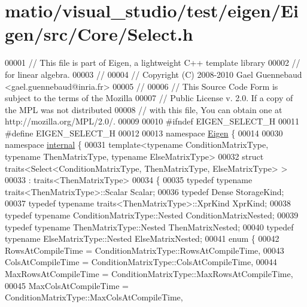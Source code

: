 \hypertarget{matio_2visual__studio_2test_2eigen_2_eigen_2src_2_core_2_select_8h_source}{}\section{matio/visual\+\_\+studio/test/eigen/\+Eigen/src/\+Core/\+Select.h}
\label{matio_2visual__studio_2test_2eigen_2_eigen_2src_2_core_2_select_8h_source}

\begin{DoxyCode}
00001 \textcolor{comment}{// This file is part of Eigen, a lightweight C++ template library}
00002 \textcolor{comment}{// for linear algebra.}
00003 \textcolor{comment}{//}
00004 \textcolor{comment}{// Copyright (C) 2008-2010 Gael Guennebaud <gael.guennebaud@inria.fr>}
00005 \textcolor{comment}{//}
00006 \textcolor{comment}{// This Source Code Form is subject to the terms of the Mozilla}
00007 \textcolor{comment}{// Public License v. 2.0. If a copy of the MPL was not distributed}
00008 \textcolor{comment}{// with this file, You can obtain one at http://mozilla.org/MPL/2.0/.}
00009 
00010 \textcolor{preprocessor}{#ifndef EIGEN\_SELECT\_H}
00011 \textcolor{preprocessor}{#define EIGEN\_SELECT\_H}
00012 
00013 \textcolor{keyword}{namespace }\hyperlink{namespace_eigen}{Eigen} \{ 
00014 
00030 \textcolor{keyword}{namespace }\hyperlink{namespaceinternal}{internal} \{
00031 \textcolor{keyword}{template}<\textcolor{keyword}{typename} ConditionMatrixType, \textcolor{keyword}{typename} ThenMatrixType, \textcolor{keyword}{typename} ElseMatrixType>
00032 \textcolor{keyword}{struct }traits<Select<ConditionMatrixType, ThenMatrixType, ElseMatrixType> >
00033  : traits<ThenMatrixType>
00034 \{
00035   \textcolor{keyword}{typedef} \textcolor{keyword}{typename} traits<ThenMatrixType>::Scalar Scalar;
00036   \textcolor{keyword}{typedef} Dense StorageKind;
00037   \textcolor{keyword}{typedef} \textcolor{keyword}{typename} traits<ThenMatrixType>::XprKind XprKind;
00038   \textcolor{keyword}{typedef} \textcolor{keyword}{typename} ConditionMatrixType::Nested ConditionMatrixNested;
00039   \textcolor{keyword}{typedef} \textcolor{keyword}{typename} ThenMatrixType::Nested ThenMatrixNested;
00040   \textcolor{keyword}{typedef} \textcolor{keyword}{typename} ElseMatrixType::Nested ElseMatrixNested;
00041   \textcolor{keyword}{enum} \{
00042     RowsAtCompileTime = ConditionMatrixType::RowsAtCompileTime,
00043     ColsAtCompileTime = ConditionMatrixType::ColsAtCompileTime,
00044     MaxRowsAtCompileTime = ConditionMatrixType::MaxRowsAtCompileTime,
00045     MaxColsAtCompileTime = ConditionMatrixType::MaxColsAtCompileTime,

\end{DoxyCode}
